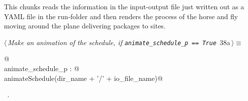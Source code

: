 \documentclass[11.5pt]{report}
\begin{document}
\vspace{-0.8cm} \newchunk This chunks reads the information in the input-output file just written out as
a YAML file in the run-folder and then renders the process of the horse and fly moving around the plane 
delivering packages to sites. 

\begin{flushleft} \small
\begin{minipage}{\linewidth}\label{scrap49}\raggedright\small
{} $\langle\,${\itshape Make an animation of the schedule, if \verb|animate_schedule_p == True|}\nobreak\ {\footnotesize {38a}}$\,\rangle\equiv$
\vspace{-1ex}
\begin{list}{}{} \item
\mbox{}\verb@   @\\
\mbox{}\verb@if animate_schedule_p : @\\
\mbox{}\verb@     animateSchedule(dir_name + '/' + io_file_name)@\\
\mbox{}\verb@@{\NWsep}
\end{list}
\vspace{-1.5ex}
\footnotesize
\begin{list}{}{\setlength{\itemsep}{-\parsep}\setlength{\itemindent}{-\leftmargin}}
\item \NWtxtMacroRefIn\ .

\item{}
\end{list}
\end{minipage}\vspace{4ex}
\end{flushleft}

\vspace{-0.8cm}\newchunk 
\end{document}
